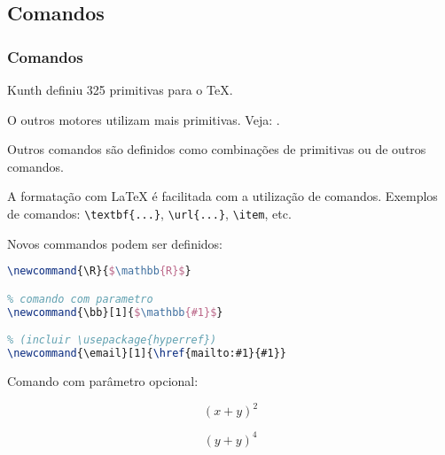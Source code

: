 \subsection{Comandos}

\begin{frame}
\frametitle{Comandos}
Kunth definiu 325 primitivas para o \TeX{}.

\vspace{3ex}
O outros motores utilizam mais primitivas.
Veja: .


\vspace{3ex}
Outros comandos são definidos como combinações de primitivas ou de outros comandos.

\framebreak 

A formatação com \LaTeX{} é facilitada com a utilização de comandos.
Exemplos de comandos: \verb|\textbf{...}|, \verb|\url{...}|, \verb|\item|, etc.

\vspace{3ex}
Novos commandos podem ser definidos:
\begin{lstlisting}[language=tex, label=lst-comand-def, postbreak=\mbox{$\hookrightarrow$\space}, basicstyle=\fontsize{8}{10}\selectfont\ttfamily]
% comando simples (incluir \usepackage{amsfonts})
\newcommand{\R}{$\mathbb{R}$}

% comando com parametro
\newcommand{\bb}[1]{$\mathbb{#1}$} 

% (incluir \usepackage{hyperref})
\newcommand{\email}[1]{\href{mailto:#1}{#1}}
\end{lstlisting}

\framebreak

Comando com parâmetro opcional:
\begin{LTXexample}
\newcommand{\plusbinomial}[3][2]{(#2 + #3)^#1}

\[ \plusbinomial{x}{y} \]

\[ \plusbinomial[4]{y}{y} \]
\end{LTXexample}
\end{frame}



